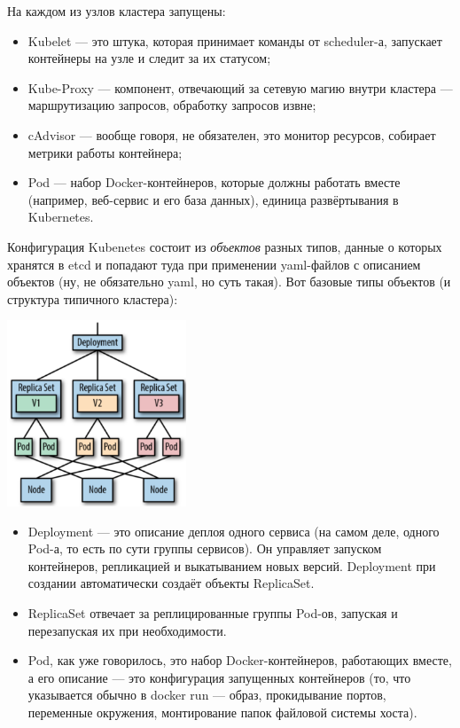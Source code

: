 \documentclass{../../text-style}
\begin{document}
На каждом из узлов кластера запущены:

\begin{itemize}
    \item Kubelet --- это штука, которая принимает команды от scheduler-а, запускает контейнеры на узле и следит за их статусом;
    \item Kube-Proxy --- компонент, отвечающий за сетевую магию внутри кластера --- маршрутизацию запросов, обработку запросов извне;
    \item cAdvisor --- вообще говоря, не обязателен, это монитор ресурсов, собирает метрики работы контейнера;
    \item Pod --- набор Docker-контейнеров, которые должны работать вместе (например, веб-сервис и его база данных), единица развёртывания в Kubernetes.
\end{itemize}

Конфигурация Kubenetes состоит из \emph{объектов} разных типов, данные о которых хранятся в etcd и попадают туда при применении yaml-файлов с описанием объектов (ну, не обязательно yaml, но суть такая). Вот базовые типы объектов (и структура типичного кластера):

\begin{center}
    \includegraphics[width=0.4\textwidth]{kubernetesObjects.png}
\end{center}

\begin{itemize}
    \item Deployment --- это описание деплоя одного сервиса (на самом деле, одного Pod-а, то есть по сути группы сервисов). Он управляет запуском контейнеров, репликацией и выкатыванием новых версий. Deployment при создании автоматически создаёт объекты ReplicaSet.
    \item ReplicaSet отвечает за реплицированные группы Pod-ов, запуская и перезапуская их при необходимости.
    \item Pod, как уже говорилось, это набор Docker-контейнеров, работающих вместе, а его описание --- это конфигурация запущенных контейнеров (то, что указывается обычно в docker run --- образ, прокидывание портов, переменные окружения, монтирование папок файловой системы хоста).
\end{itemize}
\end{document}
